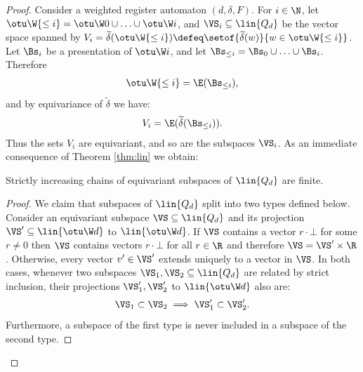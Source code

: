 \begin{proof}%
Consider a weighted register automaton $(d, \delta, F)$.
%
For $i \in \N$, let $\otu \W {\leq i} = \otu \W 0 \cup \ldots \cup \otu \W i$, and
$\VS_i\subseteq\lin{Q_d}$ be the vector space spanned by 
$V_i = \widetilde\delta(\otu \W {\leq i}) \defeq \setof{\widetilde\delta(w)}{w\in\otu \W {\leq i}}$.
Let $\Bs_i$ be a presentation of $\otu \W i$, and let
$\Bs_{\leq i} = \Bs_0 \cup \ldots \cup \Bs_i$.
Therefore
%
\begin{align} \label{eq:VVi}
\otu \W {\leq i} = \E(\Bs_{\leq i}), 
\end{align}
%
and
by equivariance of $\widetilde\delta$ we have:
%
\begin{align} \label{eq:Vi}
V_i = \E(\widetilde\delta(\Bs_{\leq i})).
\end{align}
%
Thus  the sets $V_i$ are equivariant,  and so are the subspaces $\VS_i$.
As an immediate consequence of Theorem \ref{thm:lin} we obtain:
%
\begin{claimrep} 
\label{claim:linbot}
Strictly increasing chains of equivariant subspaces of $\lin {Q_d}$ are finite.
\end{claimrep}
%
\begin{proof}
%
We claim that subspaces of $\lin{Q_d}$ split into two types defined below.
Consider an equivariant subspace $\VS\subseteq \lin{Q_d}$ and
its projection $\VS'\subseteq\lin{\otu \W d}$ to $\lin{\otu \W d}$.
If $\VS$ contains a vector $r\cdot\bot$ for some $r\neq 0$ then 
$\VS$ contains vectors $r\cdot\bot$ for all $r\in\R$ and therefore
$\VS = \VS'\times\R$.
Otherwise, every vector $v' \in \VS'$ extends uniquely to a vector in $\VS$.
In both cases, whenever two subspaces $\VS_1, \VS_2\subseteq \lin{Q_d}$ are related by strict inclusion,
their projections $\VS'_1, \VS'_2$ to $\lin{\otu \W d}$ also are:
%
\begin{align} \label{eq:VSiff}
\VS_1\subset\VS_2 \implies \VS'_1\subset\VS'_2.
\end{align}
%
Furthermore, a subspace of the first type is never included in a subspace of the second type.

\end{proof}
\end{proof}
